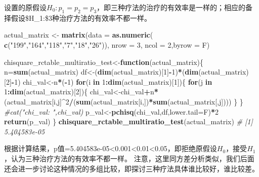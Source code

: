 \documentclass[
]{article}
\newenvironment{Shaded}{\begin{snugshade}}{\end{snugshade}}
\newcommand{\CommentTok}[1]{\textcolor[rgb]{0.56,0.35,0.01}{\textit{#1}}}
\newcommand{\ControlFlowTok}[1]{\textcolor[rgb]{0.13,0.29,0.53}{\textbf{#1}}}
\newcommand{\DataTypeTok}[1]{\textcolor[rgb]{0.13,0.29,0.53}{#1}}
\newcommand{\DecValTok}[1]{\textcolor[rgb]{0.00,0.00,0.81}{#1}}
\newcommand{\KeywordTok}[1]{\textcolor[rgb]{0.13,0.29,0.53}{\textbf{#1}}}
\newcommand{\NormalTok}[1]{#1}
\newcommand{\OperatorTok}[1]{\textcolor[rgb]{0.81,0.36,0.00}{\textbf{#1}}}
\newcommand{\StringTok}[1]{\textcolor[rgb]{0.31,0.60,0.02}{#1}}
\begin{document}
设置的原假设\(H_0: p_1=p_2=p_3\)，即三种疗法的治疗的有效率是一样的；相应的备择假设\$H\_1:\$3种治疗方法的有效率不都一样。

\begin{Shaded}
\begin{Highlighting}[]
\NormalTok{actual_matrix <-}\StringTok{ }\KeywordTok{matrix}\NormalTok{(}\DataTypeTok{data =} \KeywordTok{as.numeric}\NormalTok{( }\KeywordTok{c}\NormalTok{(}\StringTok{"199"}\NormalTok{,}\StringTok{"164"}\NormalTok{,}\StringTok{"118"}\NormalTok{,}\StringTok{"7"}\NormalTok{,}\StringTok{"18"}\NormalTok{,}\StringTok{"26"}\NormalTok{)), }
\DataTypeTok{nrow =} \DecValTok{3}\NormalTok{, }\DataTypeTok{ncol =} \DecValTok{2}\NormalTok{,}\DataTypeTok{byrow =}\NormalTok{ F)}

\NormalTok{chisquare_rctable_multiratio_test<-}\ControlFlowTok{function}\NormalTok{(actual_matrix)\{}
\NormalTok{     n=}\KeywordTok{sum}\NormalTok{(actual_matrix)}
\NormalTok{     df<-(}\KeywordTok{dim}\NormalTok{(actual_matrix)[}\DecValTok{1}\NormalTok{]}\OperatorTok{-}\DecValTok{1}\NormalTok{)}\OperatorTok{*}\NormalTok{(}\KeywordTok{dim}\NormalTok{(actual_matrix)[}\DecValTok{2}\NormalTok{]}\OperatorTok{-}\DecValTok{1}\NormalTok{)}
\NormalTok{     chi_val<-n}\OperatorTok{*}\NormalTok{(}\OperatorTok{-}\DecValTok{1}\NormalTok{)}
     \ControlFlowTok{for}\NormalTok{(i }\ControlFlowTok{in} \DecValTok{1}\OperatorTok{:}\KeywordTok{dim}\NormalTok{(actual_matrix)[}\DecValTok{1}\NormalTok{])\{}
          \ControlFlowTok{for}\NormalTok{(j }\ControlFlowTok{in} \DecValTok{1}\OperatorTok{:}\KeywordTok{dim}\NormalTok{(actual_matrix)[}\DecValTok{2}\NormalTok{])\{}
\NormalTok{               chi_val<-chi_val}\OperatorTok{+}\NormalTok{n}\OperatorTok{*}\NormalTok{(actual_matrix[i,j]}\OperatorTok{^}\DecValTok{2}\OperatorTok{/}\NormalTok{(}\KeywordTok{sum}\NormalTok{(actual_matrix[i,])}\OperatorTok{*}\KeywordTok{sum}\NormalTok{(actual_matrix[,j])))}
\NormalTok{          \}}
\NormalTok{     \}}
     \CommentTok{#cat("chi_val: ",chi_val)}
\NormalTok{     p_val<-}\KeywordTok{pchisq}\NormalTok{(chi_val,df,}\DataTypeTok{lower.tail=}\NormalTok{F)}\OperatorTok{*}\DecValTok{2} 
     \KeywordTok{return}\NormalTok{(p_val)}
\NormalTok{\}}
\KeywordTok{chisquare_rctable_multiratio_test}\NormalTok{(actual_matrix)}
\CommentTok{# [1] 5.404583e-05}
\end{Highlighting}
\end{Shaded}

根据计算结果，p值=5.404583e-05\textless0.001\textless0.01\textless0.05，即拒绝原假设\(H_0\)，接受\(H_1\)，认为三种治疗方法的有效率不都一样。
注意，这里同方差分析类似，我们后面还会进一步讨论这种情况的多组比较，即探讨三种疗法具体谁比较好，谁比较差。
\end{document}
